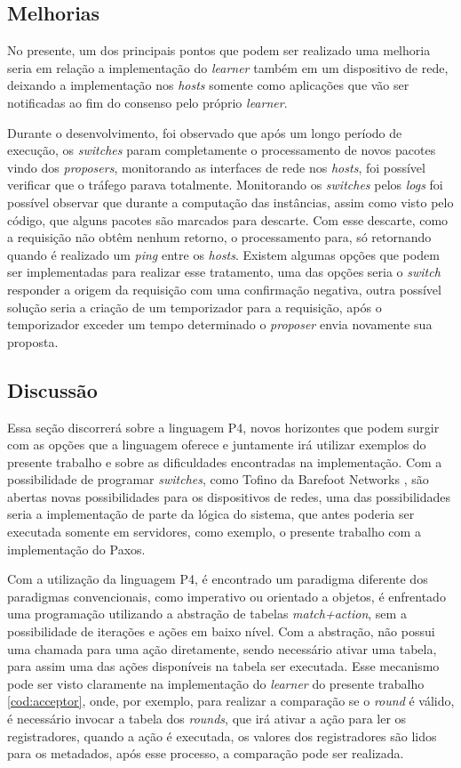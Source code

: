 \documentclass[
    12pt,
    openright, 
    oneside,
    a4paper,
    french,
    english,
    brazil
    ]{facom-ufu-abntex2}
\theoremstyle{definition}
\begin{document}
\subsection{Melhorias}
No presente, um dos principais pontos que podem ser realizado uma melhoria seria em relação a implementação do \emph{learner}
também em um dispositivo de rede, deixando a implementação nos \emph{hosts} somente como aplicações que vão ser notificadas
ao fim do consenso pelo próprio \emph{learner}.

Durante o desenvolvimento, foi observado que após um longo período de execução, os \emph{switches} param completamente o
processamento de novos pacotes vindo dos \emph{proposers}, monitorando as interfaces de rede nos \emph{hosts}, foi possível 
verificar que o tráfego parava totalmente. Monitorando os \emph{switches} pelos \emph{logs} foi possível observar que durante a
computação das instâncias, assim como visto pelo código, que alguns pacotes são marcados para descarte. Com esse descarte, como a requisição
não obtêm nenhum retorno, o processamento para, só retornando quando é realizado um \emph{ping} entre os \emph{hosts}.
Existem algumas opções que podem ser implementadas para realizar esse tratamento, uma das opções seria o \emph{switch}
responder a origem da requisição com uma confirmação negativa, outra possível solução seria a criação de um temporizador para
a requisição, após o temporizador exceder um tempo determinado o \emph{proposer} envia novamente sua proposta.

\subsection{Discussão}
Essa seção discorrerá sobre a linguagem P4, novos horizontes que podem surgir com as opções que a linguagem oferece e juntamente
irá utilizar exemplos do presente trabalho e sobre as dificuldades encontradas na implementação. Com a possibilidade de programar
\emph{switches}, como Tofino da Barefoot Networks \cite{tofinoSwitch}, são abertas novas possibilidades para os dispositivos de redes,
uma das possibilidades seria a implementação de parte da lógica do sistema, que antes poderia ser executada somente em servidores, como
exemplo, o presente trabalho com a implementação do Paxos.

Com a utilização da linguagem P4, é encontrado um paradigma diferente dos paradigmas convencionais, como imperativo ou orientado a objetos,
é enfrentado uma programação utilizando a abstração de tabelas \emph{match+action}, sem a possibilidade de iterações e ações em baixo
nível. Com a abstração, não possui uma chamada para uma ação diretamente, sendo necessário ativar uma tabela, para assim uma das ações
disponíveis na tabela ser executada. Esse mecanismo pode ser visto claramente na implementação do \emph{learner} do presente trabalho
\ref{cod:acceptor}, onde, por exemplo, para realizar a comparação se o \emph{round} é válido, é necessário invocar a tabela dos \emph{rounds},
que irá ativar a ação para ler os registradores, quando a ação é executada, os valores dos registradores são lidos para os metadados, após
esse processo, a comparação pode ser realizada.
\end{document}
